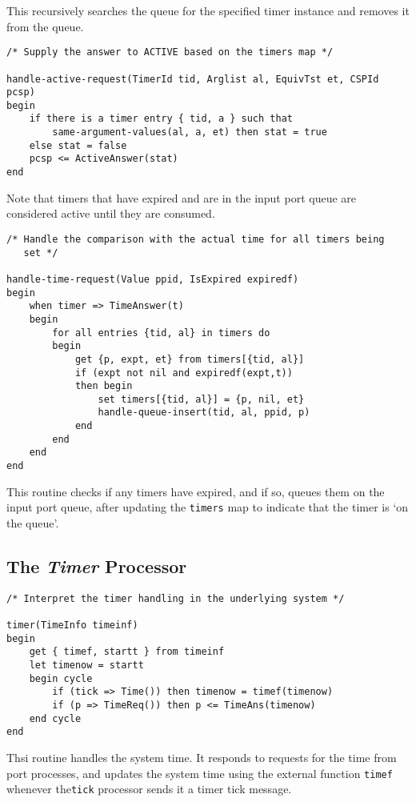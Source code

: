 This recursively searches the queue for the specified timer
instance and removes it from the queue.

\begin{verbatim}
/* Supply the answer to ACTIVE based on the timers map */

handle-active-request(TimerId tid, Arglist al, EquivTst et, CSPId pcsp)
begin
    if there is a timer entry { tid, a } such that 
        same-argument-values(al, a, et) then stat = true
    else stat = false
    pcsp <= ActiveAnswer(stat)
end
\end{verbatim}

Note that timers that have expired and are in the input port queue
are considered active until they are consumed.

\begin{verbatim}
/* Handle the comparison with the actual time for all timers being
   set */

handle-time-request(Value ppid, IsExpired expiredf)
begin
    when timer => TimeAnswer(t)
    begin
        for all entries {tid, al} in timers do
        begin
            get {p, expt, et} from timers[{tid, al}]
            if (expt not nil and expiredf(expt,t))
            then begin
                set timers[{tid, al}] = {p, nil, et}
                handle-queue-insert(tid, al, ppid, p)
            end
        end
    end
end
\end{verbatim}

This routine checks if any timers have expired, and if so, queues
them on the input port queue, after updating the {\tt timers} map
to indicate that the timer is `on the queue'.

\subsection{The {\em Timer} Processor}

\begin{verbatim}
/* Interpret the timer handling in the underlying system */

timer(TimeInfo timeinf)
begin
    get { timef, startt } from timeinf
    let timenow = startt
    begin cycle
        if (tick => Time()) then timenow = timef(timenow)
        if (p => TimeReq()) then p <= TimeAns(timenow)
    end cycle
end
\end{verbatim}

Thsi routine handles the system time. It responds to requests for the
time from port processes, and updates the system time using the
external function {\tt timef} whenever the{\tt tick} processor sends
it a timer tick message.

